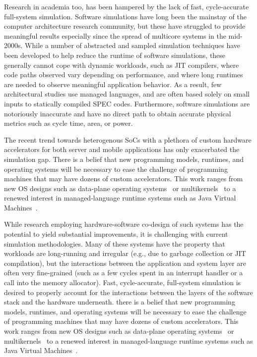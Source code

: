 Research in academia too, has been hampered by the lack of fast,
cycle-accurate full-system simulation.  Software simulations have long been the
mainstay of the computer architecture research community, but these have
struggled to provide meaningful results especially since the spread of
multicore systems in the mid-2000s.  While a number of abstracted and sampled
simulation techniques have been developed to help reduce the runtime of
software simulations, these generally cannot cope with dynamic workloads, such
as JIT compilers, where code paths observed vary depending on performance, and
where long runtimes are needed to observe meaningful application behavior.  As
a result, few architectural studies use managed languages, and are often based
solely on small inputs to statically compiled SPEC codes.  Furthermore, software
simulations are notoriously inaccurate and have no direct path to obtain
accurate physical metrics such as cycle time, area, or power.

The recent trend towards heterogenous SoCs with a plethora of custom hardware
accelerators for both server and mobile applications has only exacerbated the
simulation gap. There is a belief that new programming models, runtimes, and
operating systems will be necessary to ease the challenge of programming
machines that may have dozens of custom accelerators. This work ranges from new
OS designs such as data-plane operating systems~\cite{arrakis} or
multikernels~\cite{barrelfish} to a renewed interest in managed-language
runtime systems such as Java Virtual Machines~\cite{broom,taurus}.

While research employing hardware-software co-design of such systems has the
potential to yield substantial improvements, it is challenging with current
simulation methodologies.  Many of these systems have the property that
workloads are long-running and irregular (e.g., due to garbage collection or
JIT compilation), but the interactions between the application and system layer
are often very fine-grained (such as a few cycles spent in an interrupt handler
or a call into the memory allocator).  Fast, cycle-accurate, full-system
simulation is desired to properly account for the interactions between the
layers of the software stack and the hardware underneath.  there is a belief
that new programming models, runtimes, and operating systems will be necessary
to ease the challenge of programming machines that may have dozens of custom
accelerators. This work ranges from new OS designs such as data-plane operating
systems~\cite{arrakis} or multikernels~\cite{barrelfish} to a renewed interest
in managed-language runtime systems such as Java Virtual
Machines~\cite{broom,taurus}.

